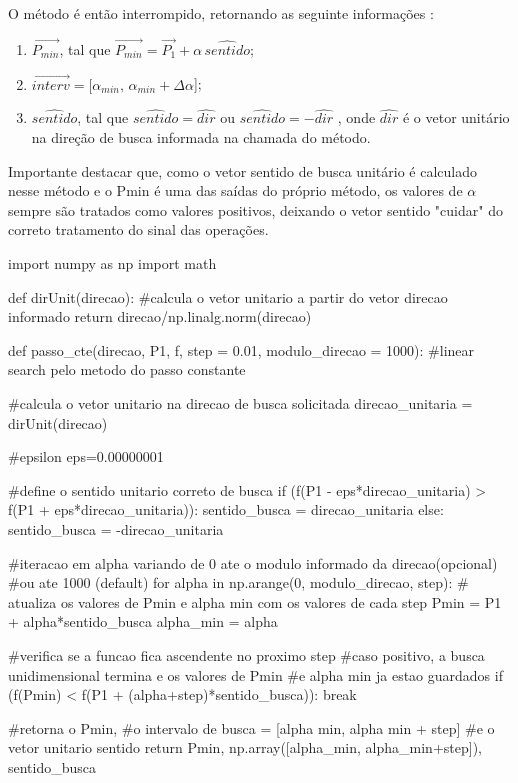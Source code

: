 \documentclass[10pt, a4paper]{article}
\begin{document}
O método é então interrompido, retornando as seguinte informações :
\begin{enumerate}
  \item $\overrightarrow{P_{min}}$, tal que $\overrightarrow{P_{min}} = \overrightarrow{P_1} + \alpha\,\hat{sentido}$;
  \item $\overrightarrow{interv} = [\alpha_{min}, \,\alpha_{min} + \Delta\alpha$];
  \item $\hat{sentido}$, tal que $\hat{sentido} = \hat{dir}$ ou $\hat{sentido} = -\hat{dir}$ , onde $\hat{dir}$ é o vetor unitário
 na direção de busca informada na chamada do método.
\end{enumerate}

Importante destacar que, como o vetor sentido de busca unitário é calculado nesse método e o Pmin é uma das saídas
do próprio método, os valores de $\alpha$ sempre são tratados como valores positivos, deixando o vetor sentido "cuidar" do 
correto tratamento do sinal das operações.

\begin{python}
  import numpy as np
  import math

  def dirUnit(direcao):
    #calcula o vetor unitario a partir do vetor direcao informado
    return direcao/np.linalg.norm(direcao)

    def passo_cte(direcao, P1, f, step = 0.01, modulo_direcao = 1000):
    #linear search pelo metodo do passo constante
    
    #calcula o vetor unitario na direcao de busca solicitada
    direcao_unitaria = dirUnit(direcao)
    
    #epsilon
    eps=0.00000001
    
    #define o sentido unitario correto de busca
    if (f(P1 - eps*direcao_unitaria) > f(P1 + eps*direcao_unitaria)):
        sentido_busca = direcao_unitaria
    else:
        sentido_busca = -direcao_unitaria
        
    #iteracao em alpha variando de 0 ate o modulo informado da direcao(opcional)
    #ou ate 1000 (default)
    for alpha in np.arange(0, modulo_direcao, step):
        # atualiza os valores de Pmin e alpha min com os valores de cada step
        Pmin = P1 + alpha*sentido_busca
        alpha_min = alpha
                
        #verifica se a funcao fica ascendente no proximo step
        #caso positivo, a busca unidimensional termina e os valores de Pmin
        #e alpha min ja estao guardados
        if (f(Pmin) < f(P1 + (alpha+step)*sentido_busca)):
            break
        
        #retorna o Pmin, 
        #o intervalo de busca = [alpha min, alpha min + step] 
        #e o vetor unitario sentido                
    return Pmin, np.array([alpha_min, alpha_min+step]), sentido_busca

\end{python}
\end{document}
